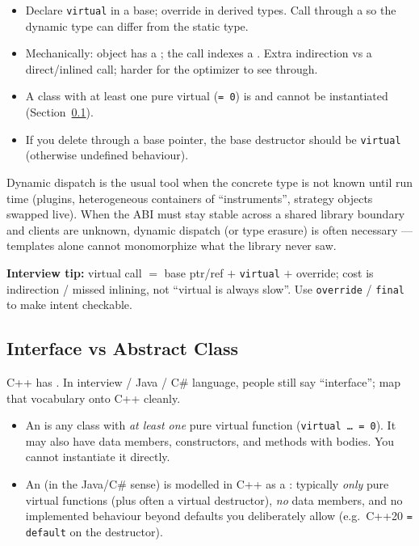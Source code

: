 \begin{itemize}
    \item Declare \texttt{virtual} in a base; override in derived types. 
          Call through a  so the dynamic 
          type can differ from the static type.
    \item Mechanically: object has a ; the call indexes a 
          . Extra indirection vs a direct/inlined call; 
          harder for the optimizer to see through.
    \item A class with at least one pure virtual (\texttt{= 0}) is 
           and cannot be instantiated 
          (Section~\ref{subsec:interface-vs-abstract}).
    \item If you delete through a base pointer, the base destructor should be 
          \texttt{virtual} (otherwise undefined behaviour).
\end{itemize}
Dynamic dispatch is the usual tool when the concrete type is not known until 
run time (plugins, heterogeneous containers of ``instruments'', strategy 
objects swapped live). When the ABI must stay stable across a shared library 
boundary and clients are unknown, dynamic dispatch (or type erasure) is often 
necessary --- templates alone cannot monomorphize what the library never saw.

\par\noindent\textbf{Interview tip:} virtual call $=$ base ptr/ref $+$ 
\texttt{virtual} $+$ override; cost is indirection / missed inlining, not 
``virtual is always slow''. Use \texttt{override} / \texttt{final} to make 
intent checkable.

\subsection{Interface vs Abstract Class}
\label{subsec:interface-vs-abstract}
C++ has . In interview / Java / C\# 
language, people still say ``interface''; map that vocabulary onto C++ 
cleanly.

\begin{itemize}
    \item An  is any class with \emph{at least one} 
          pure virtual function (\texttt{virtual \ldots{} = 0}). It may also 
          have data members, constructors, and methods with bodies. You cannot 
          instantiate it directly.
    \item An  (in the Java/C\# sense) is modelled in C++ 
          as a : typically 
          \emph{only} pure virtual functions (plus often a virtual destructor), 
          \emph{no} data members, and no implemented behaviour beyond defaults 
          you deliberately allow (e.g.\ C++20 \texttt{= default} on the 
          destructor).
\end{itemize}

